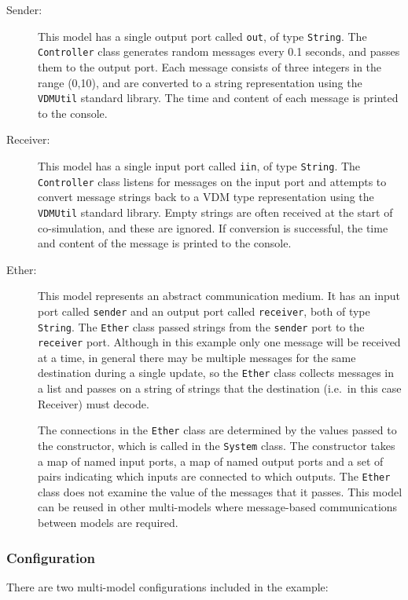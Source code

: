 \begin{description}
  \item[Sender:] This model has a single output port called \texttt{out}, of type \texttt{String}. The \texttt{Controller} class generates random messages every 0.1 seconds, and passes them to the output port. Each message consists of three integers in the range (0,10), and are converted to a string representation using the \texttt{VDMUtil} standard library. The time and content of each message is printed to the console.
  \item[Receiver:] This model has a single input port called \texttt{iin}, of type \texttt{String}. The \texttt{Controller} class listens for messages on the input port and attempts to convert message strings back to a VDM type representation using the \texttt{VDMUtil} standard library. Empty strings are often received at the start of co-simulation, and these are ignored. If conversion is successful, the time and content of the message is printed to the console.
  \item[Ether:] This model represents an abstract communication medium. It has an input port called \texttt{sender} and an output port called \texttt{receiver}, both of type \texttt{String}. The \texttt{Ether} class passed strings from the \texttt{sender} port to the \texttt{receiver} port. Although in this example only one message will be received at a time, in general there may be multiple messages for the same destination during a single update, so the \texttt{Ether} class collects messages in a list and passes on a string of strings that the destination (i.e.\ in this case Receiver) must decode.

      The connections in the \texttt{Ether} class are determined by the values passed to the constructor, which is called in the \texttt{System} class. The constructor takes a map of named input ports, a map of named output ports and a set of pairs indicating which inputs are connected to which outputs. The \texttt{Ether} class does not examine the value of the messages that it passes. This model can be reused in other multi-models where message-based communications between models are required.
\end{description}

\subsubsection{Configuration}

There are two multi-model configurations included in the example:

